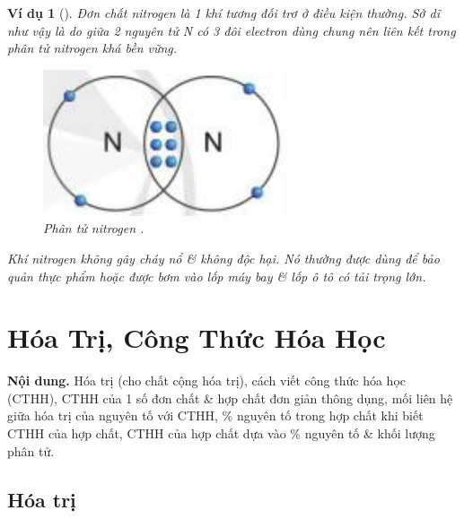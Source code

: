 \documentclass{article}
\newtheorem{vidu}{Ví dụ}
\begin{document}
\begin{vidu}[]
	Đơn chất nitrogen là 1 khí tương đối trơ ở điều kiện thường. Sở dĩ như vậy là do giữa 2 nguyên tử \emph{N} có 3 đôi electron dùng chung nên liên kết trong phân tử nitrogen khá bền vững.
	\begin{figure}[H]
		\centering
		\includegraphics[scale=0.3]{nitrogen}
		\caption{Phân tử nitrogen .}
	\end{figure}
	Khí nitrogen không gây cháy nổ \& không độc hại. Nó thường được dùng để bảo quản thực phẩm hoặc được bơm vào lốp máy bay \& lốp ô tô có tải trọng lớn.
\end{vidu}
\noindent{}


\section{Hóa Trị, Công Thức Hóa Học}
\textsf{\textbf{Nội dung.} Hóa trị (cho chất cộng hóa trị), cách viết công thức hóa học (CTHH), CTHH của 1 số đơn chất \& hợp chất đơn giản thông dụng, mối liên hệ giữa hóa trị của nguyên tố với CTHH, \% nguyên tố trong hợp chất khi biết CTHH của hợp chất, CTHH của hợp chất dựa vào \% nguyên tố \& khối lượng phân tử.}

\subsection{Hóa trị}
\end{document}
